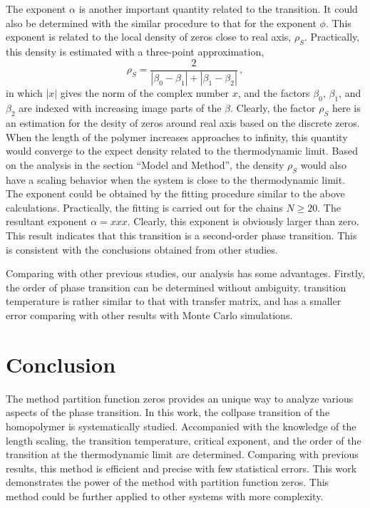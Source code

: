 \documentclass[preprint,preprintnumbers,amsmath,amssymb,showpacs,aps,pre]{revtex4-1}
\begin{document}
The exponent $\alpha$ is another important quantity related to the transition.
It could also be determined with the similar procedure to that for the
exponent $\phi$. This exponent is related to the local density of zeros close
to real axis, $\rho_S$. Practically, this density is estimated with a
three-point approximation,
\begin{equation}
\rho_S=\frac{2}{|\beta_0-\beta_1|+|\beta_1-\beta_2|} \, ,
\end{equation}
in which $|x|$ gives the norm of the complex number $x$, and the factors
$\beta_0$, $\beta_1$, and $\beta_2$ are indexed with increasing image parts of
the $\beta$. Clearly, the factor $\rho_S$ here is an estimation for the desity
of zeros around real axis based on the discrete zeros. When the length of the
polymer increases approaches to infinity, this quantity would converge to
the expect density related to the thermodynamic limit. Based on the analysis
in the section ``Model and Method'', the density $\rho_S$ would also have a
scaling behavior when the system is close to the thermodynamic limit. The
exponent could be obtained by the fitting procedure similar to the above
calculations. Practically, the fitting is carried out for the chains $N\ge
20$. The resultant exponent $\alpha=xxx$. Clearly, this exponent is obviously
larger than zero. This result indicates that this transition is a second-order
phase transition. This is consistent with the conclusions obtained from other
studies.

Comparing with other previous studies, our analysis has some advantages.
Firstly, the order of phase transition can be determined without ambiguity. transition temperature is rather
similar to that with transfer matrix, and has a smaller error comparing with
other results with Monte Carlo simulations. 

\section{Conclusion}

The method partition function zeros provides an unique way to analyze various
aspects of the phase transition. In this work, the collpase transition of the
homopolymer is systematically studied. Accompanied with the knowledge of the
length scaling, the transition temperature, critical exponent, and the order
of the transition at the thermodynamic limit are determined. Comparing with
previous results, this method is efficient and precise with few statistical
errors. This work demonstrates the power of the method with partition function
zeros. This method could be further applied to other systems with more
complexity.
\end{document}
